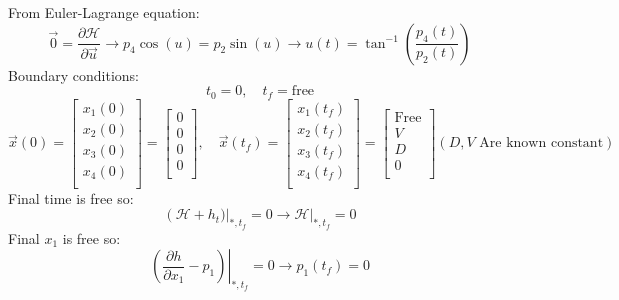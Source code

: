 From Euler-Lagrange equation:
\begin{equation}\label{AnsU}
	{\vec{0}} = \dfrac{\partial \mathcal{H} }{\partial \vec{u}} \to 
	p_4\cos(u) = p_2\sin(u) \to u(t) = \tan^{-1}\left(\dfrac{p_4(t)}{p_2(t)}\right)
\end{equation}
Boundary conditions:
$$t_0 = 0,\quad t_f = \text{free}$$
$$\vec{x}(0) = \begin{bmatrix}
	x_1(0) \\
	x_2(0) \\
	x_3(0) \\
	x_4(0) \\
\end{bmatrix}= \begin{bmatrix}
	0 \\
	0 \\
	0 \\
	0 \\
\end{bmatrix}, \quad
\vec{x}(t_f) = \begin{bmatrix}
	x_1(t_f) \\
	x_2(t_f) \\
	x_3(t_f) \\
	x_4(t_f) \\
\end{bmatrix}= \begin{bmatrix}
	\text{Free} \\
	V \\
	D \\
	0 \\
\end{bmatrix}
(D, V \text{ Are known constant})$$
Final time is free so:
\begin{equation}\label{timeBand}
	\left(\mathcal{H} + h_t)\right \vert_{*, t_f} = 0 \to \mathcal{H} \vert_{*, t_f} = 0 
\end{equation}
Final $x_1$ is free so:
\begin{equation}\label{Solvep_1Q2_a}
	\left.(\dfrac{\partial h}{\partial x_1} - p_1) \right \vert_{*, t_f} = 0 \to p_1(t_f) = 0
\end{equation}

